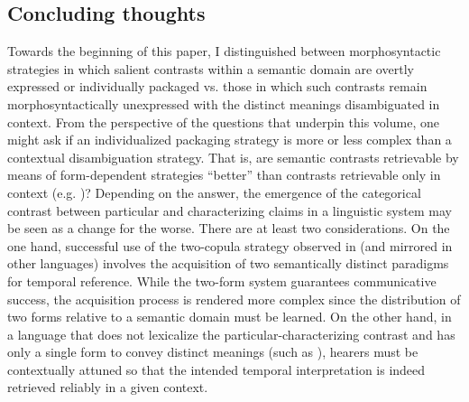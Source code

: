 \documentclass[output=paper,hidelinks]{langscibook}
\begin{document}
\begin{exe}
\begin{xlist}
\begin{xlist}
\begin{exe}
\begin{exe}
\begin{exe}
\begin{exe}
\begin{xlist}
\begin{exe}
\begin{xlist}
\begin{exe}
\begin{xlist}
\section{Concluding thoughts}\label{discconc}
Towards the beginning of this paper, I distinguished between morphosyntactic strategies in which salient contrasts within a semantic domain are overtly expressed or individually packaged vs. those in which such contrasts remain morphosyntactically unexpressed with the distinct meanings disambiguated in context. From the perspective of the questions that underpin this volume, one might ask if an individualized packaging strategy is more or less complex than a contextual disambiguation strategy. That is, are semantic contrasts retrievable by means of form-dependent strategies ``better'' than contrasts retrievable only in context (e.g. )?
Depending on the answer, the emergence of the categorical contrast between particular and characterizing claims in a linguistic system may be seen as a change for the worse. There are at least two considerations. On the one hand, successful use of the two-copula strategy observed in  (and mirrored in other  languages) involves the acquisition of two semantically distinct paradigms for temporal reference. While the two-form system guarantees communicative success, the acquisition process is rendered more complex since the distribution of two forms relative to a semantic domain must be learned. On the other hand, in a language that does not lexicalize the particular-characterizing contrast and has only a single form to convey distinct meanings (such as ), hearers must be contextually attuned so that the intended temporal interpretation is indeed retrieved reliably in a given context.


\end{xlist}
\end{exe}
\end{xlist}
\end{exe}
\end{xlist}
\end{exe}
\end{exe}
\end{exe}
\end{exe}
\end{xlist}
\end{xlist}
\end{exe}
\end{document}

